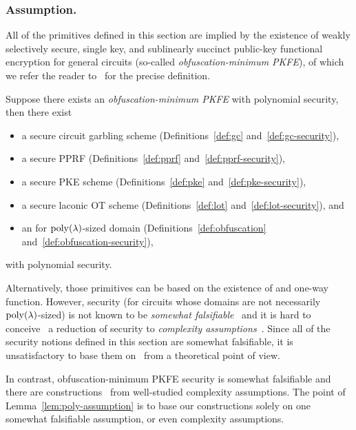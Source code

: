 \subsubsection{Assumption.}
All of the primitives defined in this section are implied by the existence of
weakly selectively secure, single key, and sublinearly succinct
public-key functional encryption for general circuits
(so-called \emph{obfuscation-minimum PKFE}),
of which we refer the reader to~\cite{C:KNTY19} for the precise definition.

\begin{lemma}\label{lem:poly-assumption}
Suppose there exists an \emph{obfuscation-minimum PKFE} with polynomial security, then there exist
\begingroup
{}
\begin{itemize}
\item {}
a secure circuit garbling scheme (Definitions~\ref{def:gc} and~\ref{def:gc-security}),
\item {}
a secure PPRF (Definitions~\ref{def:pprf} and~\ref{def:pprf-security}),
\item {}
a secure PKE scheme (Definitions~\ref{def:pke} and~\ref{def:pke-security}),
\item {}
a secure laconic OT scheme (Definitions~\ref{def:lot} and~\ref{def:lot-security}), and
\item {}
an {\iO} for $\operatorname{poly}(\lambda)$-sized domain (Definitions~\ref{def:obfuscation} and~\ref{def:obfuscation-security}),
\end{itemize}
with polynomial security.
\endgroup
\end{lemma}

\noindent
Alternatively, those primitives can be based on the existence of {\iO} and one-way function.
However, {\iO} security (for circuits whose domains are not necessarily $\operatorname{poly}(\lambda)$-sized) is not known to be \emph{somewhat falsifiable}~\cite{C:Naor03} and it is hard to conceive~\cite{STOC:GGSW13} a reduction of {\iO} security to \emph{complexity assumptions}~\cite{TCC:GolKal16}.
Since all of the security notions defined in this section are somewhat falsifiable,
it is unsatisfactory to base them on~{\iO} from a theoretical point of view.

In contrast, obfuscation-minimum PKFE security is somewhat falsifiable and there are constructions~\cite{STOC:JaiLinSah21,EPRINT:JaiLinSah21corrected} from well-studied complexity assumptions.
The point of Lemma~\ref{lem:poly-assumption} is to base our constructions solely on one somewhat falsifiable assumption, or even complexity assumptions.
